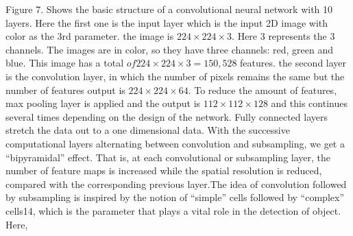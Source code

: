 \documentclass[12pt]{article}
\begin{document}
    Figure 7. Shows the basic structure of a convolutional neural network with 10 layers. Here the first one is the input layer which is the input 2D image with color as the 3rd parameter. the image is $224\times224\times3$. Here 3 represents the 3 channels. The images are in color, so they have three channels: red, green and blue. This image has a total $of 224\times224\times3 = 150,528$ features. the second layer is the convolution layer, in which the number of pixels remains the same but the number of features output is $224\times224\times64$. To reduce the amount of features, max pooling layer is applied and the output is $112\times112\times128$ and this continues several times depending on the design of the network. Fully connected layers stretch the data out to a one dimensional data. With the successive computational layers alternating between convolution and subsampling, we get a “bipyramidal” effect. That is, at each convolutional or subsampling layer, the number of feature maps is increased while the spatial resolution is reduced, compared with the corresponding previous layer.The idea of convolution followed by subsampling is inspired by the notion of “simple” cells followed by “complex” cells14, which is the parameter that plays a vital role in the detection of object. Here, 
\end{document}
